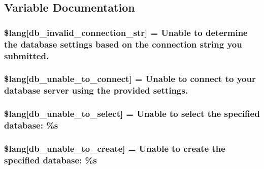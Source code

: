 \subsection{Variable Documentation}
\hypertarget{db__lang_8php_a0c2ed2613101d37cbaba14042530c16d}{}
\subsubsection[{\$lang}]{\setlength{\rightskip}{0pt plus 5cm}\$lang\mbox{[}\textquotesingle{}db\+\_\+invalid\+\_\+connection\+\_\+str\textquotesingle{}\mbox{]} = \textquotesingle{}Unable to determine the database settings based {\bf on} the connection string you submitted.\textquotesingle{}}\label{db__lang_8php_a0c2ed2613101d37cbaba14042530c16d}
\hypertarget{db__lang_8php_aa5935b86c957eb15ac7d41cf84143d66}{}
\subsubsection[{\$lang}]{\setlength{\rightskip}{0pt plus 5cm}\$lang\mbox{[}\textquotesingle{}db\+\_\+unable\+\_\+to\+\_\+connect\textquotesingle{}\mbox{]} = \textquotesingle{}Unable to connect to your database server using the provided settings.\textquotesingle{}}\label{db__lang_8php_aa5935b86c957eb15ac7d41cf84143d66}
\hypertarget{db__lang_8php_a3c93974df838c0e036690874108715ea}{}
\subsubsection[{\$lang}]{\setlength{\rightskip}{0pt plus 5cm}\$lang\mbox{[}\textquotesingle{}db\+\_\+unable\+\_\+to\+\_\+select\textquotesingle{}\mbox{]} = \textquotesingle{}Unable to select the specified database\+: \%s\textquotesingle{}}\label{db__lang_8php_a3c93974df838c0e036690874108715ea}
\hypertarget{db__lang_8php_a4266e3b235feb16d9cf2e88afd1fedac}{}
\subsubsection[{\$lang}]{\setlength{\rightskip}{0pt plus 5cm}\$lang\mbox{[}\textquotesingle{}db\+\_\+unable\+\_\+to\+\_\+create\textquotesingle{}\mbox{]} = \textquotesingle{}Unable to create the specified database\+: \%s\textquotesingle{}}\label{db__lang_8php_a4266e3b235feb16d9cf2e88afd1fedac}
\hypertarget{db__lang_8php_a2cbf4ee929f45a29a0dcf21280bad485}{}
